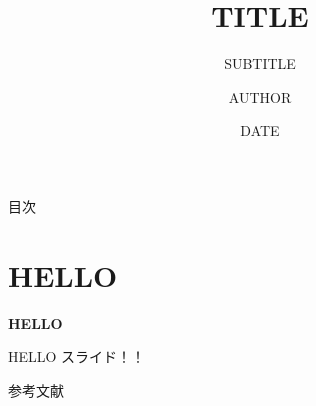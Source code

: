 \documentclass[aspectratio=169, 11pt]{beamer}
\title{{TITLE}}
\subtitle{SUBTITLE}
\author{{AUTHOR}}
\institute{{INSTITUTE}}
\date{DATE}
\theoremstyle{plain}
\newcommand{\secframe}[1]{%
  \begin{frame}[plain]
    \centering
    \color{black}\Huge\bfseries #1
  \end{frame}}
\begin{document}
\frame{\titlepage}

\begin{frame}{目次}
  \tableofcontents
\end{frame}

\section{HELLO}
\secframe{HELLO}

\begin{frame}{HELLO}
  スライド！！
\end{frame}


\begin{frame}[allowframebreaks]{参考文献}
  \scriptsize
  \printbibliography
\end{frame}
\end{document}

